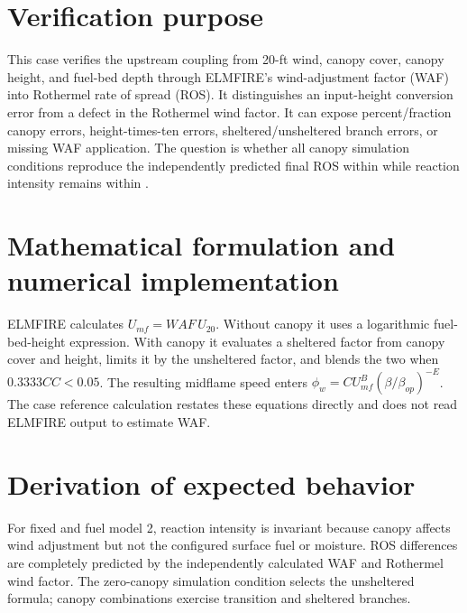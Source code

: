 \section{Verification purpose}

This case verifies the upstream coupling from 20-ft wind, canopy cover, canopy height, and fuel-bed depth through ELMFIRE's wind-adjustment factor (WAF) into Rothermel rate of spread (ROS).  It distinguishes an input-height conversion error from a defect in the Rothermel wind factor.  It can expose percent/fraction canopy errors, height-times-ten errors, sheltered/unsheltered branch errors, or missing WAF application.  The question is whether all canopy simulation conditions reproduce the independently predicted final ROS within \RosTolerance{} while reaction intensity remains within \IrTolerance{}.

\section{Mathematical formulation and numerical implementation}
ELMFIRE calculates $U_{mf}=WAF\,U_{20}$.  Without canopy it uses a logarithmic fuel-bed-height expression.  With canopy it evaluates a sheltered factor from canopy cover and height, limits it by the unsheltered factor, and blends the two when $0.3333CC<0.05$.  The resulting midflame speed enters $\phi_w=C U_{mf}^{B}(\beta/\beta_{op})^{-E}$.  The case reference calculation restates these equations directly and does not read ELMFIRE output to estimate WAF.

\section{Derivation of expected behavior}
For fixed \WindTwenty{} and fuel model 2, reaction intensity is invariant because canopy affects wind adjustment but not the configured surface fuel or moisture.  ROS differences are completely predicted by the independently calculated WAF and Rothermel wind factor.  The zero-canopy simulation condition selects the unsheltered formula; canopy combinations exercise transition and sheltered branches.

